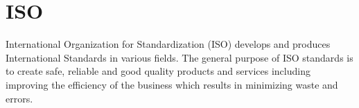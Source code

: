 \section{ISO}

International Organization for Standardization (ISO) develops and produces International Standards in various fields. The general purpose of ISO standards is to create safe, reliable and good quality products and services including improving the efficiency of the business which results in minimizing waste and errors.
